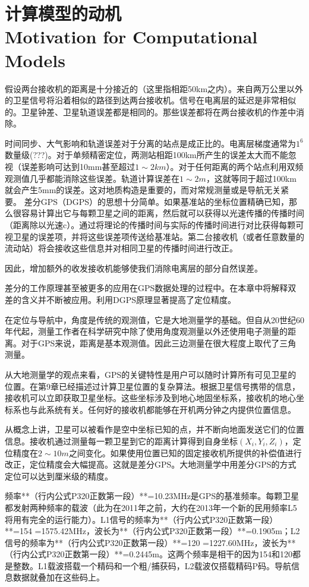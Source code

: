 \section[计算模型的动机]{计算模型的动机\\Motivation for Computational Models}

假设两台接收机的距离是十分接近的（这里指相距50km之内）。来自两万公里以外的卫星信号将沿着相似的路径到达两台接收机。信号在电离层的延迟是非常相似的。卫星钟差、卫星轨道误差都是相同的。那些误差都将在两台接收机的作差中消除。

时间同步、大气影响和轨道误差对于分离的站点是成正比的。电离层梯度通常为$1^6$数量级(???)。对于单频精密定位，两测站相距100km所产生的误差太大而不能忽视（误差影响可达到10mm甚至超过$1\sim2km$）。对于任何距离的两个站点利用双频观测值几乎都能消除这些误差。轨道计算误差在$1\sim2m$，这就等同于超过100km就会产生5mm的误差。这对地质构造是重要的，而对常规测量或是导航无关紧要。
差分GPS（DGPS）的思想十分简单。如果基准站的坐标位置精确已知，那么很容易计算出它与每颗卫星之间的距离，然后就可以获得以光速传播的传播时间（距离除以光速c）。通过将理论的传播时间与实际的传播时间进行对比获得每颗可视卫星的误差项，并将这些误差项传送给基准站。第二台接收机（或者任意数量的流动站）将会接收这些信息并对相同卫星的传播时间进行改正。

因此，增加额外的收发接收机能够使我们消除电离层的部分自然误差。

差分的工作原理甚至被更多的应用在GPS数据处理的过程中。在本章中将解释双差的含义并不断被应用。利用DGPS原理显著提高了定位精度。

在定位与导航中，角度是传统的观测值，它是大地测量学的基础。但自从20世纪60年代起，测量工作者在科学研究中除了使用角度观测量以外还使用电子测量的距离。对于GPS来说，距离是基本观测值。因此三边测量在很大程度上取代了三角测量。

从大地测量学的观点来看，GPS的关键特性是用户可以随时计算所有可见卫星的位置。在第9章已经描述过计算卫星位置的复杂算法。根据卫星信号携带的信息，接收机可以立即获取卫星坐标。这些坐标涉及到地心地固坐标系，接收机的地心坐标系也与此系统有关。任何好的接收机都能够在开机两分钟之内提供位置信息。

从概念上讲，卫星可以被看作是空中坐标已知的点，并不断向地面发送它们的位置信息。接收机通过测量每一颗卫星到它的距离计算得到自身坐标$(X_i,Y_i,Z_i)$，定位精度在$2\sim10m$之间变化。如果使用位置已知的固定接收机所提供的补偿值进行改正，定位精度会大幅提高。这就是差分GPS。大地测量学中用差分GPS的方式定位可以达到厘米级的精度。

频率**（行内公式P320正数第一段）**=10.23MHz是GPS的基准频率。每颗卫星都发射两种频率的载波（此为在2011年之前，大约在2013年一个新的民用频率L5将用有完全的运行能力）。L1信号的频率为**（行内公式P320正数第一段）**=154 =1575.42MHz，波长为**（行内公式P320正数第一段）**=0.1905m；L2信号的频率为**（行内公式P320正数第一段）**=120 =1227.60MHz，波长为**（行内公式P320正数第一段）**=0.2445m。这两个频率是相干的因为154和120都是整数。L1载波搭载一个精码和一个粗/捕获码，L2载波仅搭载精码P码。导航信息数据就叠加在这些码上。

